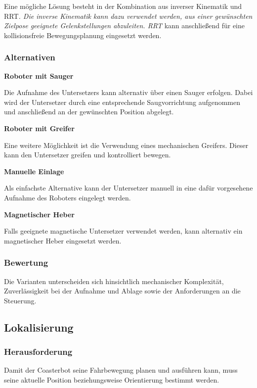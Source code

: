\documentclass[
  a4paper,
  12pt,
  DIV=12,        %
  parskip=half,  %
  headings=small %
]{scrartcl}
\theoremstyle{definition}
\theoremstyle{definition}
\begin{document}
Eine mögliche Lösung besteht in der Kombination aus inverser Kinematik
und RRT\emph{. Die inverse Kinematik kann dazu verwendet werden, aus
einer gewünschten Zielpose geeignete Gelenkstellungen abzuleiten. RRT}
kann anschließend für eine kollisionsfreie Bewegungsplanung eingesetzt
werden.

\subsubsection{Alternativen}\label{alternativen-3}

\textbf{Roboter mit Sauger}

Die Aufnahme des Untersetzers kann alternativ über einen Sauger
erfolgen. Dabei wird der Untersetzer durch eine entsprechende
Saugvorrichtung aufgenommen und anschließend an der gewünschten Position
abgelegt.

\textbf{Roboter mit Greifer}

Eine weitere Möglichkeit ist die Verwendung eines mechanischen Greifers.
Dieser kann den Untersetzer greifen und kontrolliert bewegen.

\textbf{Manuelle Einlage}

Als einfachste Alternative kann der Untersetzer manuell in eine dafür
vorgesehene Aufnahme des Roboters eingelegt werden.

\textbf{Magnetischer Heber}

Falls geeignete magnetische Untersetzer verwendet werden, kann
alternativ ein magnetischer Heber eingesetzt werden.

\subsubsection{Bewertung}\label{bewertung-3}

Die Varianten unterscheiden sich hinsichtlich mechanischer Komplexität,
Zuverlässigkeit bei der Aufnahme und Ablage sowie der Anforderungen an
die Steuerung.

\subsection{Lokalisierung}\label{lokalisierung}

\subsubsection{Herausforderung}\label{herausforderung-4}

Damit der Coasterbot seine Fahrbewegung planen und ausführen kann, muss
seine aktuelle Position beziehungsweise Orientierung bestimmt werden.
\end{document}
